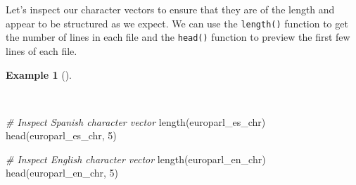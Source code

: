 \documentclass[
  letterpaper,
  DIV=11,
  numbers=noendperiod]{scrreprt}
\newenvironment{Shaded}{\begin{snugshade}}{\end{snugshade}}
\newcommand{\CommentTok}[1]{\textcolor[rgb]{0.00,0.00,0.00}{\textit{#1}}}
\newcommand{\DecValTok}[1]{\textcolor[rgb]{0.00,0.00,0.00}{#1}}
\newcommand{\FunctionTok}[1]{\textcolor[rgb]{0.00,0.00,0.00}{#1}}
\newcommand{\NormalTok}[1]{\textcolor[rgb]{0.00,0.00,0.00}{#1}}
\theoremstyle{definition}
\newtheorem{example}{Example}[chapter]
\theoremstyle{remark}
\begin{document}
Let's inspect our character vectors to ensure that they are of the
length and appear to be structured as we expect. We can use the
\texttt{length()} function to get the number of lines in each file and
the \texttt{head()} function to preview the first few lines of each
file.

\begin{example}[]\protect\hypertarget{exm-cd-europarl-inspect-chr}{}\label{exm-cd-europarl-inspect-chr}

~

\begin{Shaded}
\begin{Highlighting}[]
\CommentTok{\# Inspect Spanish character vector}
\FunctionTok{length}\NormalTok{(europarl\_es\_chr)}
\FunctionTok{head}\NormalTok{(europarl\_es\_chr, }\DecValTok{5}\NormalTok{)}

\CommentTok{\# Inspect English character vector}
\FunctionTok{length}\NormalTok{(europarl\_en\_chr)}
\FunctionTok{head}\NormalTok{(europarl\_en\_chr, }\DecValTok{5}\NormalTok{)}
\end{Highlighting}
\end{Shaded}


\end{example}
\end{document}
